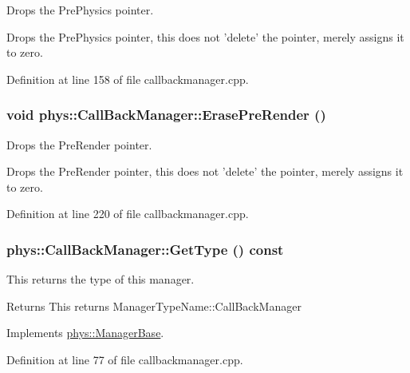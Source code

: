 Drops the PrePhysics pointer. 

Drops the PrePhysics pointer, this does not 'delete' the pointer, merely assigns it to zero. 

Definition at line 158 of file callbackmanager.cpp.

\hypertarget{classphys_1_1CallBackManager_adadf16f3f38398c9593646416ef18499}{
\subsubsection[{ErasePreRender}]{\setlength{\rightskip}{0pt plus 5cm}void phys::CallBackManager::ErasePreRender ()}}
\label{d1/d47/classphys_1_1CallBackManager_adadf16f3f38398c9593646416ef18499}


Drops the PreRender pointer. 

Drops the PreRender pointer, this does not 'delete' the pointer, merely assigns it to zero. 

Definition at line 220 of file callbackmanager.cpp.

\hypertarget{classphys_1_1CallBackManager_aa0568dd5c2d1bb6dc669dfa2ca3486ad}{
\subsubsection[{GetType}]{ phys::CallBackManager::GetType () const}}
\label{d1/d47/classphys_1_1CallBackManager_aa0568dd5c2d1bb6dc669dfa2ca3486ad}


This returns the type of this manager. 

\begin{DoxyReturn}{Returns}
This returns ManagerTypeName::CallBackManager 
\end{DoxyReturn}


Implements \hyperlink{classphys_1_1ManagerBase_aff400b6599db635e24796d8221e9a0e3}{phys::ManagerBase}.



Definition at line 77 of file callbackmanager.cpp.

